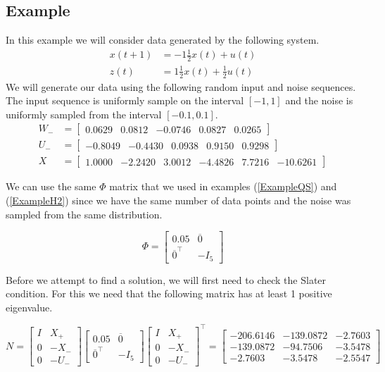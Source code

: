 \subsection{Example}
In this example we will consider data generated by the following system.
\begin{align*}
	x(t+1) &= -1\frac{1}{2}x(t) + u(t) \\
	z(t)   &=  1\frac{1}{2}x(t) + \frac{1}{2}u(t)
\end{align*}
We will generate our data using the following random input and noise sequences. The input sequence is uniformly sample on the interval $[-1,1]$ and the noise is uniformly sampled from the interval $[-0.1, 0.1]$.
\begin{align*}
	W_- &= \begin{bmatrix}  0.0629 &   0.0812 &  -0.0746 &   0.0827 &   0.0265 \end{bmatrix} \\
	U_- &= \begin{bmatrix} -0.8049 &  -0.4430 &   0.0938 &   0.9150 &   0.9298 \end{bmatrix} \\
	X   &= \begin{bmatrix}  1.0000 &  -2.2420 &   3.0012 &  -4.4826 &   7.7216 & -10.6261 \end{bmatrix}
\end{align*}

We can use the same $\Phi$ matrix that we used in examples (\ref{ExampleQS}) and (\ref{ExampleH2}) since we have the same number of data points and the noise was sampled from the same distribution. 

\begin{equation*}
\Phi = \begin{bmatrix} 0.05 & \overline{0} \\ \overline{0}^\top & -I_5 \end{bmatrix}
\end{equation*}

Before we attempt to find a solution, we will first need to check the Slater condition. For this we need that the following matrix has at least 1 positive eigenvalue.

\begin{equation*}
N = 
\begin{bmatrix} I&X_+ \\ 0 & -X_- \\ 0&-U_- \end{bmatrix}
\begin{bmatrix} 0.05 & \overline{0} \\ \overline{0}^\top & -I_5 \end{bmatrix}
\begin{bmatrix} I&X_+ \\ 0 & -X_- \\ 0&-U_- \end{bmatrix}^\top 
=
\begin{bmatrix} 
 -206.6146 &-139.0872 &  -2.7603\\
 -139.0872 & -94.7506 &  -3.5478\\
   -2.7603 &  -3.5478 &  -2.5547
\end{bmatrix} 
\end{equation*}

